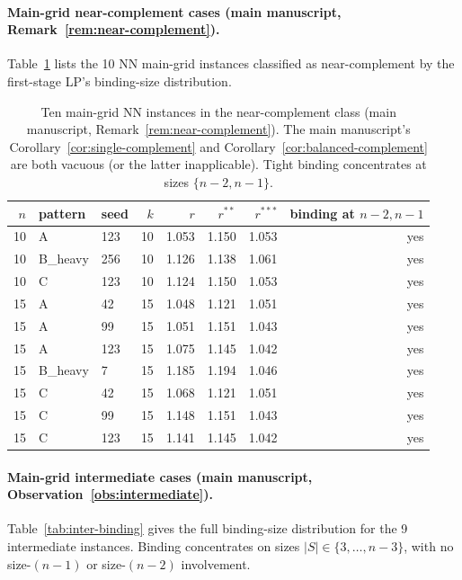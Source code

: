 \documentclass[11pt]{article}
\theoremstyle{plain}
\theoremstyle{definition}
\theoremstyle{remark}
\begin{document}
\paragraph{Main-grid near-complement cases (main manuscript, Remark~\ref{rem:near-complement}).} Table~\ref{tab:near-main} lists the 10 NN main-grid instances classified as near-complement by the first-stage LP's binding-size distribution.

\begin{table}[htbp]
\centering
\footnotesize
\caption{Ten main-grid NN instances in the near-complement class (main manuscript, Remark~\ref{rem:near-complement}). The main manuscript's Corollary~\ref{cor:single-complement} and Corollary~\ref{cor:balanced-complement} are both vacuous (or the latter inapplicable). Tight binding concentrates at sizes $\{n-2, n-1\}$.}
\label{tab:near-main}
\begin{tabular}{@{}rllrrrrr@{}}
\toprule
$n$ & pattern & seed & $k$ & $r$ & $r^{\ast\ast}$ & $r^{\ast\ast\ast}$ & binding at $n-2, n-1$ \\
\midrule
10 & A        & 123 & 10 & 1.053 & 1.150 & 1.053 & yes \\
10 & B\_heavy & 256 & 10 & 1.126 & 1.138 & 1.061 & yes \\
10 & C        & 123 & 10 & 1.124 & 1.150 & 1.053 & yes \\
15 & A        &  42 & 15 & 1.048 & 1.121 & 1.051 & yes \\
15 & A        &  99 & 15 & 1.051 & 1.151 & 1.043 & yes \\
15 & A        & 123 & 15 & 1.075 & 1.145 & 1.042 & yes \\
15 & B\_heavy &   7 & 15 & 1.185 & 1.194 & 1.046 & yes \\
15 & C        &  42 & 15 & 1.068 & 1.121 & 1.051 & yes \\
15 & C        &  99 & 15 & 1.148 & 1.151 & 1.043 & yes \\
15 & C        & 123 & 15 & 1.141 & 1.145 & 1.042 & yes \\
\bottomrule
\end{tabular}
\end{table}

\paragraph{Main-grid intermediate cases (main manuscript, Observation~\ref{obs:intermediate}).} Table~\ref{tab:inter-binding} gives the full binding-size distribution for the 9 intermediate instances. Binding concentrates on sizes $|S|\in\{3,\ldots,n-3\}$, with no size-$(n-1)$ or size-$(n-2)$ involvement.
\end{document}
